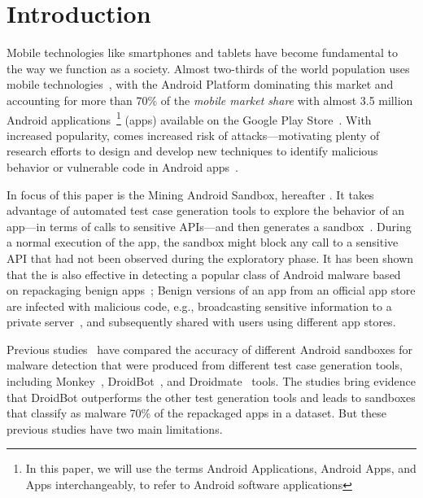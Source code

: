 \section{Introduction}\label{sec:introduction}

Mobile technologies like smartphones and tablets have become fundamental to the way we function as a society. Almost two-thirds of the world population
uses mobile technologies~\cite{Comscore,DBLP:journals/tse/MartinSJZH17}, with the
Android Platform dominating this market and accounting for more than 70\% of the \emph{mobile
market share} with almost 3.5 million Android applications~\footnote{In this paper, we will use the terms Android Applications, Android Apps, and Apps interchangeably, to refer to Android software applications} (apps)
available on the Google Play Store~\cite{Statista}. 
With increased popularity, comes increased risk of attacks---motivating plenty of research efforts to design and develop new techniques
to identify malicious behavior or vulnerable code in Android apps~\cite{10.1145/3017427}.


In focus of this paper is the Mining Android Sandbox, hereafter \mas. 
It  takes advantage of automated test case generation tools 
to explore the behavior of an app---in terms of calls to sensitive APIs---and then
generates a sandbox~\cite{DBLP:conf/icse/JamrozikSZ16}. During a normal
execution of the app, the sandbox might block any call to a sensitive API
that had not been observed during the exploratory phase. 
It has been shown that 
the \mas is also effective
in detecting a popular class of Android malware based on 
repackaging benign apps~\cite{DBLP:conf/wcre/BaoLL18,le2018towards};
Benign
versions of an app from an official app store are
infected with malicious code, e.g., broadcasting
sensitive information to a private server~\cite{DBLP:journals/tse/LiBK21}, and subsequently shared
with users using different app stores. 

Previous studies~\cite{DBLP:conf/wcre/BaoLL18,DBLP:journals/jss/CostaMMSSBNR22} 
have compared the accuracy of different Android sandboxes for malware detection 
that were produced 
from 
different test case generation tools, including Monkey~\cite{Monkey}, DroidBot~\cite{DBLP:conf/icse/LiYGC17}, and Droidmate~\cite{DBLP:conf/kbse/BorgesHZ18} tools.
The studies bring evidence that 
DroidBot outperforms the other test generation tools and leads to sandboxes that
classify as malware 70\% of the repackaged apps in a dataset.
But these previous studies have two main limitations. 

